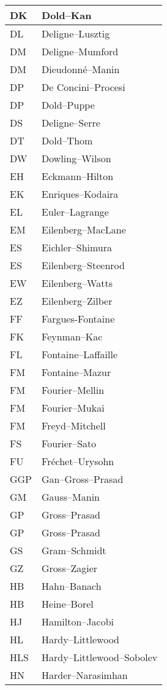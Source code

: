 \documentclass{amsart}
\numberwithin{equation}{section}
\theoremstyle{plain}
\numberwithin{equation}{section}
\theoremstyle{remark}
\begin{document}
\begin{longtable}{l|l}
DK & Dold--Kan\\ \hline
DL & Deligne--Lusztig\\ \hline
DM & Deligne--Mumford\\ \hline
DM & Dieudonné--Manin\\ \hline
DP & De Concini--Procesi\\ \hline
DP & Dold--Puppe\\ \hline
DS & Deligne--Serre \\ \hline
DT & Dold--Thom\\ \hline
DW & Dowling--Wilson\\ \hline
EH & Eckmann--Hilton\\ \hline
EK & Enriques--Kodaira\\ \hline
EL & Euler--Lagrange\\ \hline
EM & Eilenberg--MacLane\\ \hline
ES & Eichler--Shimura\\ \hline
ES & Eilenberg--Steenrod\\ \hline
EW & Eilenberg--Watts\\ \hline
EZ & Eilenberg--Zilber\\ \hline
FF & Fargues-Fontaine\\ \hline
FK & Feynman--Kac\\ \hline
FL & Fontaine--Laffaille\\ \hline
FM & Fontaine--Mazur\\ \hline
FM & Fourier--Mellin\\ \hline
FM & Fourier--Mukai\\ \hline
FM & Freyd--Mitchell\\ \hline
FS & Fourier--Sato\\ \hline
FU & Fréchet--Urysohn\\ \hline
GGP & Gan--Gross--Prasad\\ \hline
GM & Gauss--Manin\\ \hline
GP & Gross--Prasad\\ \hline
GP & Gross--Prasad\\ \hline
GS & Gram--Schmidt\\ \hline
GZ & Gross--Zagier\\ \hline
HB & Hahn--Banach\\ \hline
HB & Heine--Borel\\ \hline
HJ & Hamilton--Jacobi\\ \hline
HL & Hardy--Littlewood\\ \hline
HLS & Hardy--Littlewood--Sobolev\\ \hline
HN & Harder--Narasimhan\\ \hline

\end{longtable}
\end{document}
